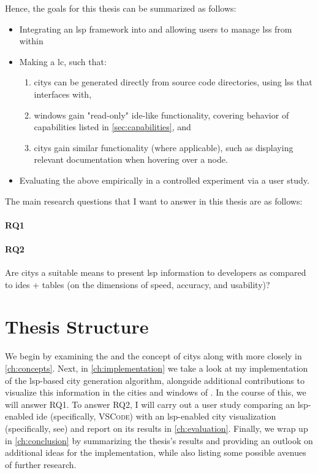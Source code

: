 \documentclass[../thesis]{subfiles}
\begin{document}
Hence, the goals for this thesis can be summarized as follows:
\begin{itemize}
	\item Integrating an \gls{lsp} framework into \SEE{} and allowing users to manage \glspl{ls} from within \SEE{}
	\item Making \SEE{} a \gls{lc}, such that:
	      \begin{enumerate}
		      \item \Glspl{city} can be generated directly from source code directories, using \glspl{ls} that \SEE{} interfaces with,
		      \item \glspl{window} gain "read-only" \gls{ide}-like functionality, covering behavior of capabilities listed in \cref{sec:capabilities}, and
		      \item \Glspl{city} gain similar functionality (where applicable), such as displaying relevant documentation when hovering over a node.
	      \end{enumerate}
	\item Evaluating the above empirically in a controlled experiment via a user study.
\end{itemize}

The main research questions that I want to answer in this thesis are as follows:
\vspace{-1.5em}
\paragraph{RQ1}
\vspace{-1.5em}
\paragraph{RQ2}
Are \glspl{city} a suitable means to present \gls{lsp} information to developers as compared to \glspl{ide} + tables (on the dimensions of speed, accuracy, and usability)?

\section{Thesis Structure}

We begin by examining the  and the concept of \glspl{city} along with \SEE{} more closely in \cref{ch:concepts}.
Next, in \cref{ch:implementation} we take a look at my implementation of the \gls{lsp}-based \gls{city} generation algorithm, alongside additional contributions to visualize this information in the cities and \glspl{window} of \SEE{}.
In the course of this, we will answer \textsf{RQ1}.
To answer \textsf{RQ2}, I will carry out a user study comparing an \gls{lsp}-enabled \gls{ide} (specifically, \textsc{VSCode}) with an \gls{lsp}-enabled \gls{city} visualization (specifically, \gls{see}) and report on its results in \cref{ch:evaluation}.
Finally, we wrap up in \cref{ch:conclusion} by summarizing the thesis's results and providing an outlook on additional ideas for the implementation, while also listing some possible avenues of further research.
\end{document}

